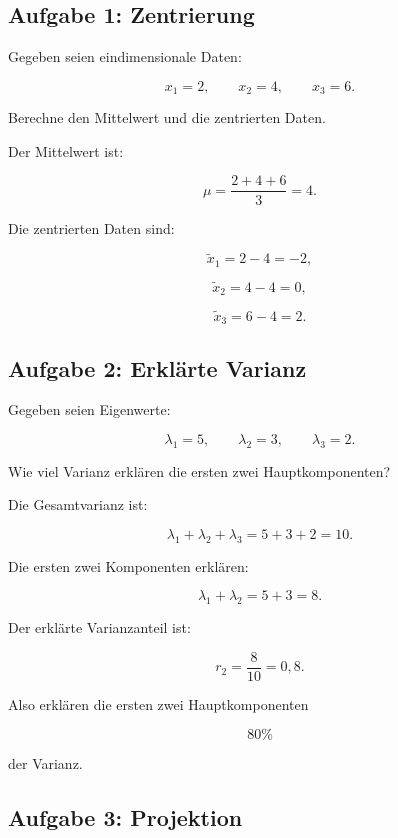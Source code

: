 \subsection{Aufgabe 1: Zentrierung}

Gegeben seien eindimensionale Daten:

\[
    x_1=2,
    \qquad
    x_2=4,
    \qquad
    x_3=6.
\]

Berechne den Mittelwert und die zentrierten Daten.

\begin{examplebox}
Der Mittelwert ist:

\[
    \mu
    =
    \frac{2+4+6}{3}
    =
    4.
\]

Die zentrierten Daten sind:

\[
    \tilde{x}_1=2-4=-2,
\]

\[
    \tilde{x}_2=4-4=0,
\]

\[
    \tilde{x}_3=6-4=2.
\]
\end{examplebox}

\subsection{Aufgabe 2: Erklärte Varianz}

Gegeben seien Eigenwerte:

\[
    \lambda_1=5,
    \qquad
    \lambda_2=3,
    \qquad
    \lambda_3=2.
\]

Wie viel Varianz erklären die ersten zwei Hauptkomponenten?

\begin{examplebox}
Die Gesamtvarianz ist:

\[
    \lambda_1+\lambda_2+\lambda_3
    =
    5+3+2
    =
    10.
\]

Die ersten zwei Komponenten erklären:

\[
    \lambda_1+\lambda_2
    =
    5+3
    =
    8.
\]

Der erklärte Varianzanteil ist:

\[
    r_2
    =
    \frac{8}{10}
    =
    0{,}8.
\]

Also erklären die ersten zwei Hauptkomponenten

\[
    80\%
\]

der Varianz.
\end{examplebox}

\subsection{Aufgabe 3: Projektion}


